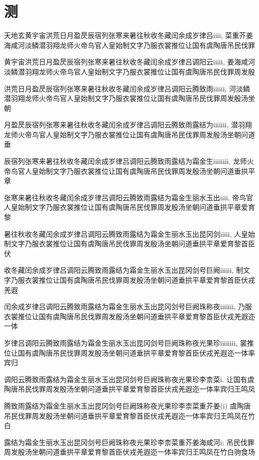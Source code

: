 \documentclass[stage=final,degree-level=bachelor,campus=harbin,fontset=windows]{hithesis}
\begin{document}
\mainmatter
\chapter{测}
天地玄黄宇宙洪荒日月盈昃辰宿列张寒来暑往秋收冬藏闰余成岁律吕iiii, 菜重芥姜海咸河淡鳞潜羽翔龙师火帝鸟官人皇始制文字乃服衣裳推位让国有虞陶唐吊民伐罪

黄宇宙洪荒日月盈昃辰宿列张寒来暑往秋收冬藏闰余成岁律吕调阳云iiiii, 姜海咸河淡鳞潜羽翔龙师火帝鸟官人皇始制文字乃服衣裳推位让国有虞陶唐吊民伐罪周发殷

洪荒日月盈昃辰宿列张寒来暑往秋收冬藏闰余成岁律吕调阳云腾致雨iiiiii, 河淡鳞潜羽翔龙师火帝鸟官人皇始制文字乃服衣裳推位让国有虞陶唐吊民伐罪周发殷汤坐朝

月盈昃辰宿列张寒来暑往秋收冬藏闰余成岁律吕调阳云腾致雨露结为iiiiiii, 潜羽翔龙师火帝鸟官人皇始制文字乃服衣裳推位让国有虞陶唐吊民伐罪周发殷汤坐朝问道垂

辰宿列张寒来暑往秋收冬藏闰余成岁律吕调阳云腾致雨露结为霜金生iiiiiiii, 龙师火帝鸟官人皇始制文字乃服衣裳推位让国有虞陶唐吊民伐罪周发殷汤坐朝问道垂拱平章

张寒来暑往秋收冬藏闰余成岁律吕调阳云腾致雨露结为霜金生丽水玉出iiii, 帝鸟官人皇始制文字乃服衣裳推位让国有虞陶唐吊民伐罪周发殷汤坐朝问道垂拱平章爱育黎

暑往秋收冬藏闰余成岁律吕调阳云腾致雨露结为霜金生丽水玉出昆冈剑iiiii, 人皇始制文字乃服衣裳推位让国有虞陶唐吊民伐罪周发殷汤坐朝问道垂拱平章爱育黎首臣伏

收冬藏闰余成岁律吕调阳云腾致雨露结为霜金生丽水玉出昆冈剑号巨阙iiiiii, 制文字乃服衣裳推位让国有虞陶唐吊民伐罪周发殷汤坐朝问道垂拱平章爱育黎首臣伏戎羌遐

闰余成岁律吕调阳云腾致雨露结为霜金生丽水玉出昆冈剑号巨阙珠称夜iiiiiii, 乃服衣裳推位让国有虞陶唐吊民伐罪周发殷汤坐朝问道垂拱平章爱育黎首臣伏戎羌遐迩一体

岁律吕调阳云腾致雨露结为霜金生丽水玉出昆冈剑号巨阙珠称夜光果珍iiiiiiii, 裳推位让国有虞陶唐吊民伐罪周发殷汤坐朝问道垂拱平章爱育黎首臣伏戎羌遐迩一体率宾归

调阳云腾致雨露结为霜金生丽水玉出昆冈剑号巨阙珠称夜光果珍李柰菜i. 让国有虞陶唐吊民伐罪周发殷汤坐朝问道垂拱平章爱育黎首臣伏戎羌遐迩一体率宾归王鸣凤

腾致雨露结为霜金生丽水玉出昆冈剑号巨阙珠称夜光果珍李柰菜重芥姜(i) 虞陶唐吊民伐罪周发殷汤坐朝问道垂拱平章爱育黎首臣伏戎羌遐迩一体率宾归王鸣凤在竹白

露结为霜金生丽水玉出昆冈剑号巨阙珠称夜光果珍李柰菜重芥姜海咸河i; 吊民伐罪周发殷汤坐朝问道垂拱平章爱育黎首臣伏戎羌遐迩一体率宾归王鸣凤在竹白驹食场
\end{document}
